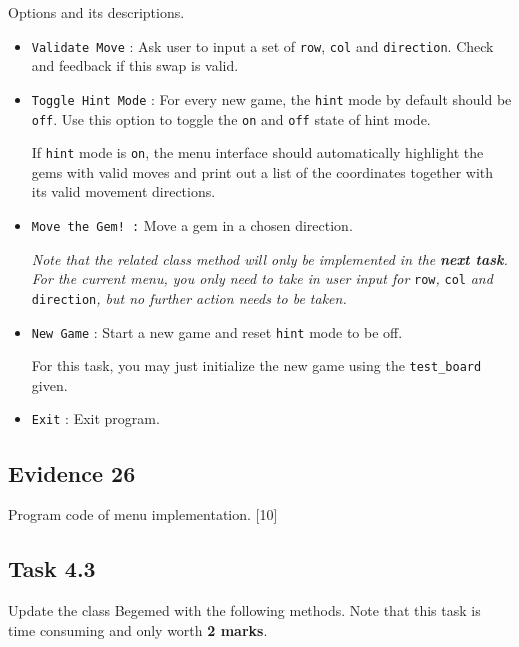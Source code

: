 Options and its descriptions.
\begin{itemize}
\item \texttt{Validate Move} : Ask user to input a set of \texttt{row},
\texttt{col} and \texttt{direction}. Check and feedback if this swap
is valid. 
\item \texttt{Toggle Hint Mode} : For every new game, the \texttt{hint}
mode by default should be \texttt{off}. Use this option to toggle
the \texttt{on} and \texttt{off} state of hint mode.

If \texttt{hint} mode is \texttt{on}, the menu interface should automatically
highlight the gems with valid moves and print out a list of the coordinates
together with its valid movement directions. 
\item \texttt{Move the Gem! :} Move a gem in a chosen direction. 

\emph{Note that the related class method will only be implemented
in the }\textbf{\emph{next task}}\emph{. For the current menu, you
only need to take in user input for }\texttt{row}\emph{, }\texttt{col}\emph{
and }\texttt{direction}\emph{, but no further action needs to be taken. }
\item \texttt{New Game} : Start a new game and reset \texttt{hint} mode
to be off. 

For this task, you may just initialize the new game using the \texttt{test\_board}
given. 
\item \texttt{Exit} : Exit program. 
\end{itemize}

\subsection*{Evidence 26}

Program code of menu implementation. \hfill{}{[}10{]}

\subsection*{Task 4.3}

Update the class Begemed with the following methods. Note that this
task is time consuming and only worth \textbf{2 marks}. 

